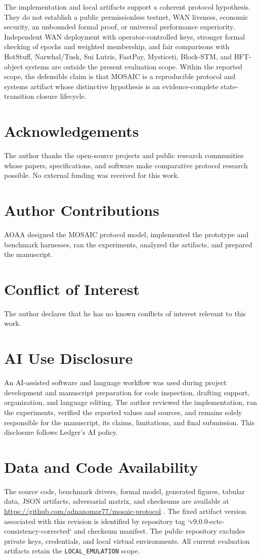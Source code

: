 \documentclass{ledger}
\begin{document}
The implementation and local artifacts support a coherent protocol hypothesis. They do not establish a public permissionless testnet, WAN liveness, economic security, an unbounded formal proof, or universal performance superiority. Independent WAN deployment with operator-controlled keys, stronger formal checking of epochs and weighted membership, and fair comparisons with HotStuff, Narwhal/Tusk, Sui Lutris, FastPay, Mysticeti, Block-STM, and BFT-object systems are outside the present evaluation scope. Within the reported scope, the defensible claim is that MOSAIC is a reproducible protocol and systems artifact whose distinctive hypothesis is an evidence-complete state-transition closure lifecycle.

\ledgernotes
\section*{Acknowledgements}
The author thanks the open-source projects and public research communities whose papers, specifications, and software make comparative protocol research possible. No external funding was received for this work.

\section*{Author Contributions}
AOAA designed the MOSAIC protocol model, implemented the prototype and benchmark harnesses, ran the experiments, analyzed the artifacts, and prepared the manuscript.

\section*{Conflict of Interest}
The author declares that he has no known conflicts of interest relevant to this work.

\section*{AI Use Disclosure}
An AI-assisted software and language workflow was used during project development and manuscript preparation for code inspection, drafting support, organization, and language editing. The author reviewed the implementation, ran the experiments, verified the reported values and sources, and remains solely responsible for the manuscript, its claims, limitations, and final submission. This disclosure follows Ledger's AI policy.

\section*{Data and Code Availability}
The source code, benchmark drivers, formal model, generated figures, tabular data, JSON artifacts, adversarial matrix, and checksums are available at \url{https://github.com/adnanomar77/mosaic-protocol} \cite{Allemon2026MOSAIC}. The fixed artifact version associated with this revision is identified by repository tag `v9.0.0-ectc-consistency-corrected` and checksum manifest. The public repository excludes private keys, credentials, and local virtual environments. All current evaluation artifacts retain the \texttt{LOCAL\_EMULATION} scope.
\end{document}
